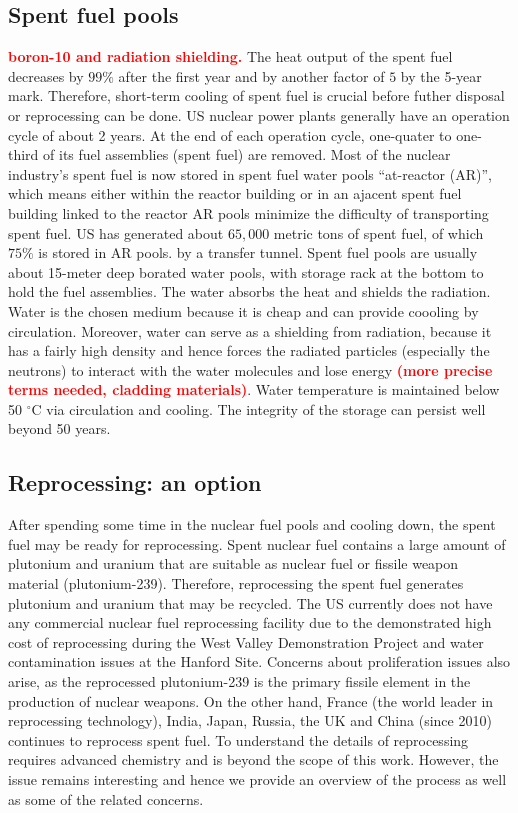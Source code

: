 \documentclass[nofootinbib,preprint,aip,pra]{revtex4-1}
\newcommand{\red}[1]{\textcolor{red}{\bf #1}}
\begin{document}
    \subsection{Spent fuel pools}
    \red{boron-10 and radiation shielding.}
    The heat output of the spent fuel decreases by $99\%$ after the first year and by another factor of $5$
    by the 5-year mark.\cite{aa12} Therefore, short-term cooling of spent fuel is crucial before
    futher disposal or reprocessing can be done.
    US nuclear power plants generally have an operation cycle of about 2 years. At the end of each operation cycle,
    one-quater to one-third of its fuel assemblies (spent fuel) are removed.
    Most of the nuclear industry's spent fuel is now stored in spent fuel water pools ``at-reactor (AR)'',
    which means either within the reactor building or in an ajacent spent fuel building linked to the reactor
    AR pools minimize the difficulty of transporting spent fuel.\cite{iaea99}
    US has generated about $65,000$ metric tons of spent fuel, of which $75\%$ is stored in AR pools.\cite{a11}
    by a transfer tunnel. 
    Spent fuel pools  are usually about 15-meter deep borated water pools, with storage rack at the bottom to hold the fuel assemblies.
    The water absorbs the heat and shields the radiation. Water is the chosen medium because it is cheap and
    can provide coooling by circulation. Moreover, water can serve as a shielding from radiation, because it has a
    fairly high density and hence forces the radiated particles (especially the neutrons) to interact with
    the water molecules and lose energy \red{(more precise terms needed, cladding materials)}. Water temperature is maintained
    below 50 $^\circ$C via circulation and cooling. The integrity of the storage can persist well beyond 
    50 years.\cite{a11, iaea99}

    \subsection{Reprocessing: an option}
    \label{sec:reproc}
    After spending some time in the nuclear fuel pools and cooling down, the spent fuel may be ready
    for reprocessing.
    Spent nuclear fuel contains a large amount of plutonium and uranium that are suitable as nuclear fuel
    or fissile weapon material (plutonium-239). Therefore, reprocessing the spent fuel generates plutonium and
    uranium that may be recycled. The US currently does not have any commercial nuclear fuel
    reprocessing facility due to the demonstrated high cost of reprocessing
    during the West Valley Demonstration Project and water contamination issues at the Hanford Site.
    Concerns about proliferation issues also arise, as the 
    reprocessed plutonium-239 is the primary fissile element in the production of nuclear weapons.\cite{aa12}
    On the other hand, France (the world leader in reprocessing technology), India, Japan, Russia, the UK
    and China (since 2010) continues to reprocess spent fuel. To understand the details of reprocessing
    requires advanced chemistry and is beyond the scope of this work. However, the issue remains interesting
    and hence we provide an overview of the process as well as some of the related concerns.
\end{document}
